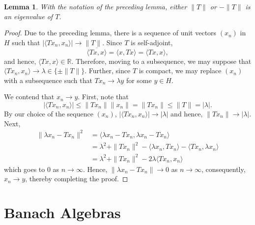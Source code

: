 \documentclass[12pt]{article}
\theoremstyle{thmstyle}
\newtheorem{lemma}[theorem]{Lemma}
\theoremstyle{defstyle}
\newcommand{\R}{\mathbb{R}}
\renewcommand{\le}{\leqslant}
\begin{document}
\begin{lemma}
    With the notation of the preceding lemma, either $\|T\|$ or $-\|T\|$ is an eigenvalue of $T$.
\end{lemma}
\begin{proof}
    Due to the preceding lemma, there is a sequence of unit vectors $(x_n)$ in $H$ such that $|\langle Tx_n, x_n\rangle|\to \|T\|$. Since $T$ is self-adjoint, 
    \begin{equation*}
        \overline{\langle Tx, x\rangle} = \langle x, Tx\rangle = \langle Tx, x\rangle,
    \end{equation*}
    and hence, $\langle Tx, x\rangle\in\R$. Therefore, moving to a subsequence, we may suppose that $\langle Tx_n, x_n\rangle\to\lambda\in\{\pm\|T\|\}$. Further, since $T$ is compact, we may replace $(x_n)$ with a subsequence such that $Tx_n\to \lambda y$ for some $y\in H$. 

    We contend that $x_n\to y$. First, note that 
    \begin{equation*}
        |\langle Tx_n, x_n\rangle|\le\|Tx_n\|\|x_n\| = \|Tx_n\|\le\|T\| = |\lambda|.
    \end{equation*}
    By our choice of the sequence $(x_n)$, $|\langle Tx_n, x_n\rangle|\to|\lambda|$ and hence, $\|Tx_n\|\to|\lambda|$. Next, 
    \begin{align*}
        \|\lambda x_n - Tx_n\|^2 &= \langle \lambda x_n - Tx_n, \lambda x_n - Tx_n\rangle\\
        &= \lambda^2 + \|Tx_n\|^2 - \langle\lambda x_n, Tx_n\rangle - \langle Tx_n,\lambda x_n\rangle\\
        &= \lambda^2 + \|Tx_n\|^2 - 2\lambda\langle Tx_n, x_n\rangle
    \end{align*}
    which goes to $0$ as $n\to\infty$. Hence, $\|\lambda x_n - Tx_n\|\to 0$ as $n\to\infty$, consequently, $x_n\to y$, thereby completing the proof.
\end{proof}

\section{Banach Algebras}
\end{document}
